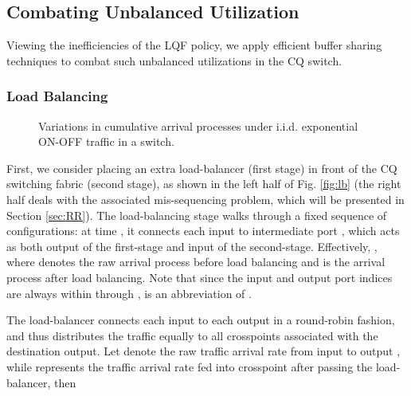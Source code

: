 \documentclass[journal,final,doublecolumn,10pt,twoside]{IEEEtranTCOM} \normalsize
\begin{document}
\subsection{Combating Unbalanced Utilization}
\label{sec:modified}

Viewing the inefficiencies of the LQF policy, we apply efficient buffer sharing techniques to combat such unbalanced utilizations in the CQ switch.

\subsubsection{Load Balancing}
\label{sec:lb}

\begin{figure*}[ht]
\centering
\begin{minipage}[t]{2.3 in}
\centering {}
\end{minipage}
\begin{minipage}[t]{2.3 in}
\centering {}
\end{minipage}
\begin{minipage}[t]{2.3 in}
\centering {}
\end{minipage}
\caption{Variations in cumulative arrival processes under i.i.d. exponential ON-OFF traffic in a  switch.}
\label{fig:difference}
\end{figure*}

First, we consider placing an extra load-balancer (first stage) in front of the CQ switching fabric (second stage), as shown in the left half of Fig. \ref{fig:lb} (the right half deals with the associated mis-sequencing problem, which will be presented in Section \ref{sec:RR}). The load-balancing stage walks through a fixed sequence of configurations: at time , it connects each input  to intermediate port , which acts as both output  of the first-stage and input  of the second-stage. Effectively, , where  denotes the raw arrival process before load balancing and  is the arrival process after load balancing. Note that since the input and output port indices are always within  through ,  is an abbreviation of . 



The load-balancer connects each input to each output in a round-robin fashion, and thus distributes the traffic equally to all crosspoints associated with the destination output. Let  denote the raw traffic arrival rate from input  to output , while  represents the traffic arrival rate fed into crosspoint  after passing the load-balancer, then
\end{document}
